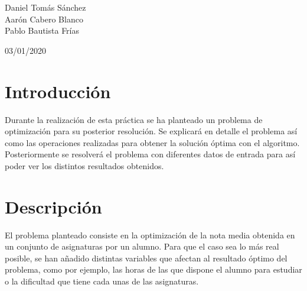 \documentclass[11pt, a4paper, titlepage]{article}
\begin{document}
	\begin{titlepage}
    	\begin{center}
        	\hrulefill

        	\vspace{0.5cm}
        	{\bf\fontsize{25}{0}{\selectfont{Optimización Heurística\\[0.5cm]}}}
        	\fontsize{15}{0}{\selectfont{Optimizar una calificación\\[0.5cm]}}
        	\hrulefill
        	\vspace{6.0cm}
    	\end{center}

    	\centering
    	{\Large Daniel Tomás Sánchez\\ Aarón Cabero Blanco \\ Pablo Bautista 				Frías \par}
    	\vspace{2cm}
    	{\Large 03/01/2020 \par}
	\end{titlepage}

\newpage


\tableofcontents

\newpage

\section{Introducción}
Durante la realización de esta práctica se ha planteado un problema de optimización para su posterior resolución. Se explicará en detalle el problema así como las operaciones realizadas para obtener la solución óptima con el algoritmo. Posteriormente se resolverá el problema con diferentes datos de entrada para así poder ver los distintos resultados obtenidos.

\newpage

\section{Descripción}
El problema planteado consiste en la optimización de la nota media obtenida en un conjunto de asignaturas por un alumno. Para que el caso sea lo más real posible, se han añadido distintas variables que afectan al resultado óptimo del problema, como por ejemplo, las horas de las que dispone el alumno para estudiar o la dificultad que tiene cada unas de las asignaturas.
\end{document}
